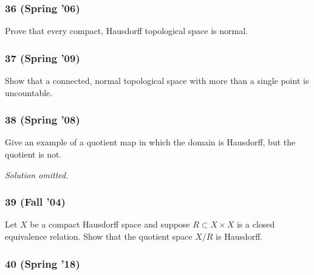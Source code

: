 \hypertarget{spring-06-1}{%
\subsubsection{36 (Spring '06)}\label{spring-06-1}}

\begin{problem}[?]

Prove that every compact, Hausdorff topological space is normal.

\end{problem}

\hypertarget{spring-09-2}{%
\subsubsection{37 (Spring '09)}\label{spring-09-2}}

\begin{problem}[?]

Show that a connected, normal topological space with more than a single
point is uncountable.

\end{problem}

\hypertarget{spring-08}{%
\subsubsection{38 (Spring '08)}\label{spring-08}}

\begin{problem}[?]

Give an example of a quotient map in which the domain is Hausdorff, but
the quotient is not.

\end{problem}

\emph{Solution omitted.}

\hypertarget{fall-04-1}{%
\subsubsection{39 (Fall '04)}\label{fall-04-1}}

\begin{problem}[?]

Let \(X\) be a compact Hausdorff space and suppose
\(R \subset X \times X\) is a closed equivalence relation. Show that the
quotient space \(X/R\) is Hausdorff.

\end{problem}

\hypertarget{spring-18-1}{%
\subsubsection{40 (Spring '18)}\label{spring-18-1}}

